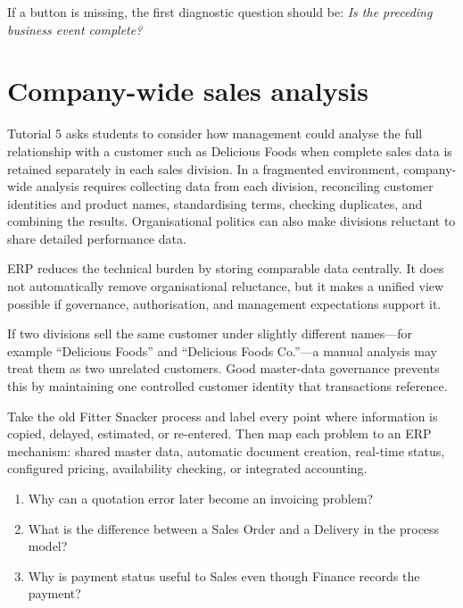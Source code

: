 If a button is missing, the first diagnostic question should be: \emph{Is the preceding business event complete?}

\section{Company-wide sales analysis}

Tutorial 5 asks students to consider how management could analyse the full relationship with a customer such as Delicious Foods when complete sales data is retained separately in each sales division. In a fragmented environment, company-wide analysis requires collecting data from each division, reconciling customer identities and product names, standardising terms, checking duplicates, and combining the results. Organisational politics can also make divisions reluctant to share detailed performance data.

ERP reduces the technical burden by storing comparable data centrally. It does not automatically remove organisational reluctance, but it makes a unified view possible if governance, authorisation, and management expectations support it.

\begin{workedexample}
If two divisions sell the same customer under slightly different names---for example ``Delicious Foods'' and ``Delicious Foods Co.''---a manual analysis may treat them as two unrelated customers. Good master-data governance prevents this by maintaining one controlled customer identity that transactions reference.
\end{workedexample}

\begin{tryit}
Take the old Fitter Snacker process and label every point where information is copied, delayed, estimated, or re-entered. Then map each problem to an ERP mechanism: shared master data, automatic document creation, real-time status, configured pricing, availability checking, or integrated accounting.
\end{tryit}

\begin{quickcheck}
\begin{enumerate}
  \item Why can a quotation error later become an invoicing problem?
  \item What is the difference between a Sales Order and a Delivery in the process model?
  \item Why is payment status useful to Sales even though Finance records the payment?
\end{enumerate}
\end{quickcheck}

